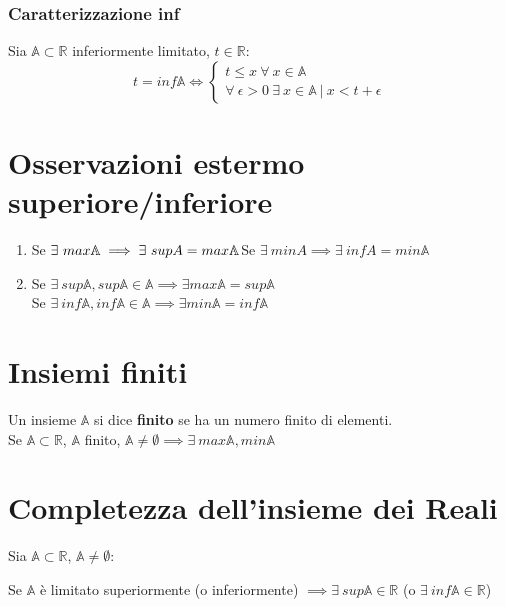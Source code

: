 \subsubsection{Caratterizzazione inf}
Sia $\mathbb{A} \subset \mathbb{R}$ inferiormente limitato, $t \in \mathbb{R}$:\\
\begin{equation}
	t=inf\mathbb{A} \iff
	\begin{cases}
	t \leq x\ \forall\ x \in \mathbb{A}\\
	\forall\ \epsilon > 0\ \exists\ x \in \mathbb{A}\ |\ x < t+\epsilon
	\end{cases}
\end{equation}

\section{Osservazioni estermo superiore/inferiore}
\begin{enumerate}
\item Se $\exists\ max\mathbb{A} \implies \exists\ supA=max\mathbb{A}\\
$Se $\exists\ minA \implies \exists\ infA=min\mathbb{A}$
\item Se $\exists\ sup\mathbb{A}, sup\mathbb{A} \in \mathbb{A} \implies \exists max\mathbb{A} = sup\mathbb{A}$\\
Se $\exists\ inf\mathbb{A}, inf\mathbb{A} \in \mathbb{A} \implies \exists min\mathbb{A} = inf\mathbb{A}$
\end{enumerate}

\section{Insiemi finiti}
Un insieme $\mathbb{A}$ si dice \textbf{finito} se ha un numero finito di elementi.\\
Se $\mathbb{A} \subset \mathbb{R}$, $\mathbb{A}$ finito, $\mathbb{A} \neq \emptyset \implies \exists\ max\mathbb{A}, min\mathbb{A}$

\label{sec: CompletezzaReali}
\section{Completezza dell'insieme dei Reali}
Sia $\mathbb{A} \subset \mathbb{R}$, $\mathbb{A} \neq \emptyset$:
\begin{center}
Se $\mathbb{A}$ è limitato superiormente (o inferiormente) $\implies \exists\ sup\mathbb{A} \in \mathbb{R}$ (o $\exists\ inf\mathbb{A} \in \mathbb{R}$)
\end{center}